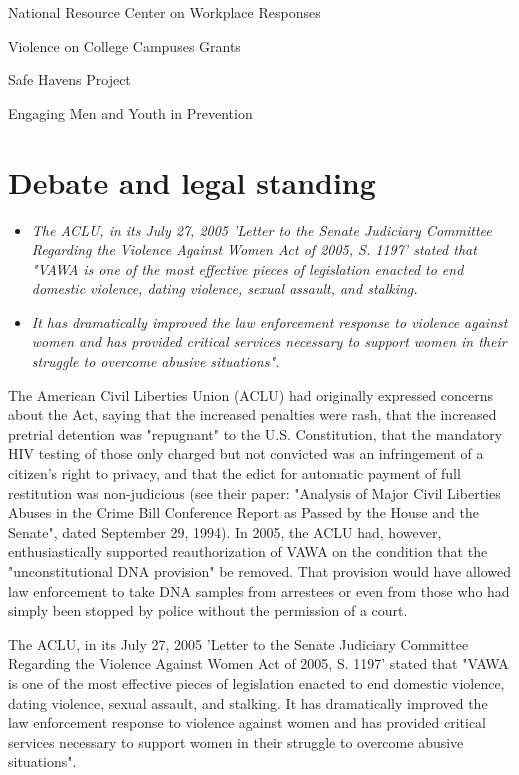 National Resource Center on Workplace Responses

Violence on College Campuses Grants

Safe Havens Project

Engaging Men and Youth in Prevention

\section{Debate and legal standing}\label{debate-and-legal-standing}

\begin{itemize}
\item
  \emph{The ACLU, in its July 27, 2005 'Letter to the Senate Judiciary
  Committee Regarding the Violence Against Women Act of 2005, S. 1197'
  stated that "VAWA is one of the most effective pieces of legislation
  enacted to end domestic violence, dating violence, sexual assault, and
  stalking.}
\item
  \emph{It has dramatically improved the law enforcement response to
  violence against women and has provided critical services necessary to
  support women in their struggle to overcome abusive situations".}
\end{itemize}

The American Civil Liberties Union (ACLU) had originally expressed
concerns about the Act, saying that the increased penalties were rash,
that the increased pretrial detention was "repugnant" to the U.S.
Constitution, that the mandatory HIV testing of those only charged but
not convicted was an infringement of a citizen's right to privacy, and
that the edict for automatic payment of full restitution was
non-judicious (see their paper: "Analysis of Major Civil Liberties
Abuses in the Crime Bill Conference Report as Passed by the House and
the Senate", dated September 29, 1994). In 2005, the ACLU had, however,
enthusiastically supported reauthorization of VAWA on the condition that
the "unconstitutional DNA provision" be removed. That provision would
have allowed law enforcement to take DNA samples from arrestees or even
from those who had simply been stopped by police without the permission
of a court.

The ACLU, in its July 27, 2005 'Letter to the Senate Judiciary Committee
Regarding the Violence Against Women Act of 2005, S. 1197' stated that
"VAWA is one of the most effective pieces of legislation enacted to end
domestic violence, dating violence, sexual assault, and stalking. It has
dramatically improved the law enforcement response to violence against
women and has provided critical services necessary to support women in
their struggle to overcome abusive situations".

